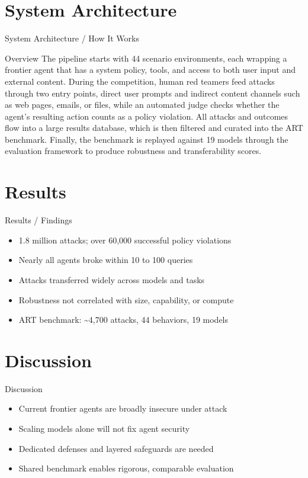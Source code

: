 \documentclass[10pt]{beamer}
\begin{document}
\section{System Architecture}
\begin{frame}{System Architecture / How It Works}
  \begin{block}{Overview}
  The pipeline starts with 44 scenario environments, each wrapping a frontier agent that has a system policy, tools, and access to both user input and external content. During the competition, human red teamers feed attacks through two entry points, direct user prompts and indirect content channels such as web pages, emails, or files, while an automated judge checks whether the agent's resulting action counts as a policy violation. All attacks and outcomes flow into a large results database, which is then filtered and curated into the ART benchmark. Finally, the benchmark is replayed against 19 models through the evaluation framework to produce robustness and transferability scores.
  \end{block}
\end{frame}

\section{Results}
\begin{frame}[allowframebreaks]{Results / Findings}
\begin{itemize}
  \item 1.8 million attacks; over 60,000 successful policy violations
  \item Nearly all agents broke within 10 to 100 queries
  \item Attacks transferred widely across models and tasks
  \item Robustness not correlated with size, capability, or compute
  \item ART benchmark: \textasciitilde{}4,700 attacks, 44 behaviors, 19 models
\end{itemize}
\end{frame}

\section{Discussion}
\begin{frame}{Discussion}
\begin{itemize}
  \item Current frontier agents are broadly insecure under attack
  \item Scaling models alone will not fix agent security
  \item Dedicated defenses and layered safeguards are needed
  \item Shared benchmark enables rigorous, comparable evaluation
\end{itemize}
\end{frame}
\end{document}
